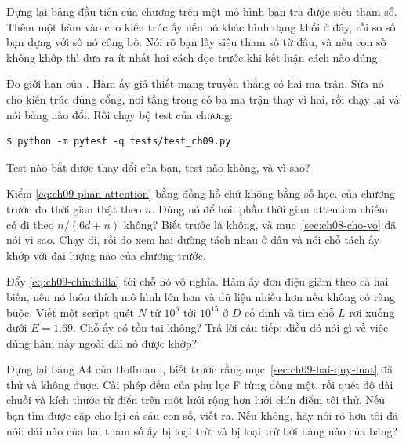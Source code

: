 \begin{bt}
  \item Dựng lại bảng đầu tiên của chương trên một mô hình bạn tra được siêu
    tham số. Thêm một hàm vào  cho kiến trúc ấy nếu nó khác
    hình dạng khối ở đây, rồi so số bạn dựng với số nó công bố. Nói rõ bạn lấy
    siêu tham số từ đâu, và nếu con số không khớp thì đưa ra ít nhất hai cách
    đọc trước khi kết luận cách nào đúng.

  \item Đo giới hạn của . Hàm ấy giả thiết mạng truyền
    thẳng có hai ma trận. Sửa nó cho kiến trúc dùng cổng, nơi tầng trong có ba
    ma trận thay vì hai, rồi chạy lại  và nói bảng nào
    đổi. Rồi chạy bộ test của chương:

    \begin{verbatim}
$ python -m pytest -q tests/test_ch09.py
    \end{verbatim}

    Test nào bắt được thay đổi của bạn, test nào không, và vì sao?

  \item Kiểm \eqref{eq:ch09-phan-attention} bằng đồng hồ chứ không bằng số học.
     của chương trước đo thời gian thật theo \(n\). Dùng
    nó để hỏi: phần thời gian attention chiếm có đi theo \(n/(6d+n)\) không?
    Biết trước là không, và mục~\ref{sec:ch08-cho-vo} đã nói vì sao. Chạy đi,
    rồi đo xem hai đường tách nhau ở đâu và nói chỗ tách ấy khớp với đại lượng
    nào của chương trước.

  \item Đẩy \eqref{eq:ch09-chinchilla} tới chỗ nó vô nghĩa. Hàm ấy đơn điệu
    giảm theo cả hai biến, nên nó luôn thích mô hình lớn hơn và dữ liệu nhiều
    hơn nếu không có ràng buộc. Viết một script quét \(N\) từ \(10^{6}\) tới
    \(10^{15}\) ở \(D\) cố định và tìm chỗ \(L\) rơi xuống dưới \(E = 1.69\).
    Chỗ ấy có tồn tại không? Trả lời câu tiếp: điều đó nói gì về việc dùng hàm
    này ngoài dải nó được khớp?

  \item Dựng lại bảng A4 của Hoffmann, biết trước rằng
    mục~\ref{sec:ch09-hai-quy-luat} đã thử và không được. Cài phép đếm của phụ
    lục F từng dòng một, rồi quét độ dài chuỗi và kích thước từ điển trên một
    lưới rộng hơn lưới chín điểm tôi thử. Nếu bạn tìm được cặp cho lại cả sáu
    con số, viết ra. Nếu không, hãy nói rõ hơn tôi đã nói: dải nào của hai tham
    số ấy bị loại trừ, và bị loại trừ bởi hàng nào của bảng?
\end{bt}

